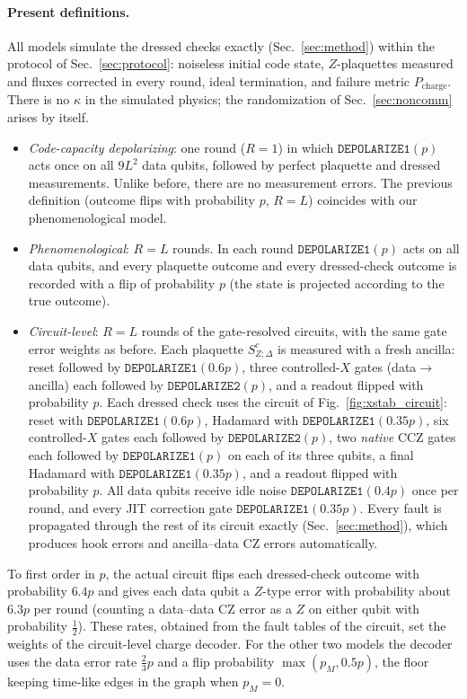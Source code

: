 \documentclass[a4paper]{article}
\begin{document}
\paragraph{Present definitions.}
All models simulate the dressed checks exactly (Sec.~\ref{sec:method}) within the protocol of Sec.~\ref{sec:protocol}: noiseless initial code state, $Z$-plaquettes measured and fluxes corrected in every round, ideal termination, and failure metric $P_{\mathrm{charge}}$. There is no $\kappa$ in the simulated physics; the randomization of Sec.~\ref{sec:noncomm} arises by itself.
\begin{itemize}[leftmargin=*,itemsep=0pt]
\item \emph{Code-capacity depolarizing}: one round ($R=1$) in which $\mathtt{DEPOLARIZE1}(p)$ acts once on all $9L^2$ data qubits, followed by perfect plaquette and dressed measurements. Unlike before, there are no measurement errors. The previous definition (outcome flips with probability $p$, $R=L$) coincides with our phenomenological model.
\item \emph{Phenomenological}: $R=L$ rounds. In each round $\mathtt{DEPOLARIZE1}(p)$ acts on all data qubits, and every plaquette outcome and every dressed-check outcome is recorded with a flip of probability $p$ (the state is projected according to the true outcome).
\item \emph{Circuit-level}: $R=L$ rounds of the gate-resolved circuits, with the same gate error weights as before. Each plaquette $S^c_{Z;\Delta}$ is measured with a fresh ancilla: reset followed by $\mathtt{DEPOLARIZE1}(0.6p)$, three controlled-$X$ gates (data$\to$ancilla) each followed by $\mathtt{DEPOLARIZE2}(p)$, and a readout flipped with probability $p$. Each dressed check uses the circuit of Fig.~\ref{fig:xstab_circuit}: reset with $\mathtt{DEPOLARIZE1}(0.6p)$, Hadamard with $\mathtt{DEPOLARIZE1}(0.35p)$, six controlled-$X$ gates each followed by $\mathtt{DEPOLARIZE2}(p)$, two \emph{native} CCZ gates each followed by $\mathtt{DEPOLARIZE1}(p)$ on each of its three qubits, a final Hadamard with $\mathtt{DEPOLARIZE1}(0.35p)$, and a readout flipped with probability $p$. All data qubits receive idle noise $\mathtt{DEPOLARIZE1}(0.4p)$ once per round, and every JIT correction gate $\mathtt{DEPOLARIZE1}(0.35p)$. Every fault is propagated through the rest of its circuit exactly (Sec.~\ref{sec:method}), which produces hook errors and ancilla--data CZ errors automatically.
\end{itemize}
To first order in $p$, the actual circuit flips each dressed-check outcome with probability $6.4p$ and gives each data qubit a $Z$-type error with probability about $6.3p$ per round (counting a data--data CZ error as a $Z$ on either qubit with probability $\tfrac12$). These rates, obtained from the fault tables of the circuit, set the weights of the circuit-level charge decoder. For the other two models the decoder uses the data error rate $\tfrac23p$ and a flip probability $\max(p_M,0.5p)$, the floor keeping time-like edges in the graph when $p_M=0$.
\end{document}

